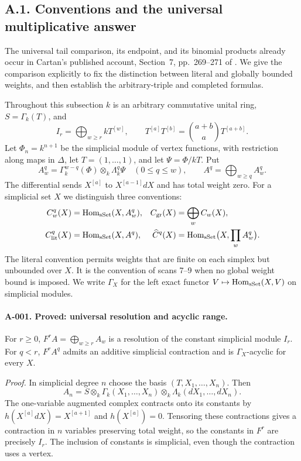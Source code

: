 \subsection{A.1. Conventions and the universal multiplicative answer}

The universal tail comparison, its endpoint, and its binomial products
already occur in Cartan's published account, Section~7,
pp.~269--271 of \cite{A_Cartan1976}. We give the comparison explicitly
to fix the distinction between literal and globally bounded weights,
and then establish the arbitrary-triple and completed formulas.

Throughout this subsection $k$ is an arbitrary commutative unital ring,
$S=\Gamma_k(T)$, and
\[
 I_r=\bigoplus_{w\geq r}kT^{[w]},\qquad
 T^{[a]}T^{[b]}=\binom{a+b}{a}T^{[a+b]}.
\]
Let $\Phi_n=k^{n+1}$ be the simplicial module of vertex functions, with
restriction along maps in $\Delta$, let $T=(1,\ldots,1)$, and let
$\Psi=\Phi/kT$. Put
\[
 A_w^q=\Gamma_k^{w-q}(\Phi)\otimes_k\Lambda_k^q\Psi
 \quad(0\leq q\leq w),\qquad A^q=\bigoplus_{w\geq q}A_w^q.
\]
The differential sends $X^{[a]}$ to $X^{[a-1]}dX$ and has total weight
zero. For a simplicial set $X$ we distinguish three conventions:
\begin{align*}
 C_w^q(X)&=\operatorname{Hom}_{\mathrm{sSet}}(X,A_w^q),&
 C_{\mathrm{gr}}(X)&=\bigoplus_w C_w(X),\\
 C_{\mathrm{lit}}^q(X)&=\operatorname{Hom}_{\mathrm{sSet}}(X,A^q),&
 \widehat C^q(X)&=\operatorname{Hom}_{\mathrm{sSet}}\bigl(X,\prod_w A_w^q\bigr).
\end{align*}
The literal convention permits weights that are finite on each simplex
but unbounded over $X$. It is the convention of scans 7--9 when no
global weight bound is imposed. We write $\Gamma_X$ for the left exact
functor $V\mapsto\operatorname{Hom}_{\mathrm{sSet}}(X,V)$ on simplicial modules.

\paragraph{A-001. Proved: universal resolution and acyclic range.}
For $r\geq0$, $F^rA=\bigoplus_{w\geq r}A_w$ is a resolution of the
constant simplicial module $I_r$. For $q<r$, $F^rA^q$ admits an additive
simplicial contraction and is $\Gamma_X$-acyclic for every $X$.

\emph{Proof.}
In simplicial degree $n$ choose the basis $(T,X_1,\ldots,X_n)$.
Then
\[
 A_n=S\otimes_k\Gamma_k(X_1,\ldots,X_n)
                 \otimes_k\Lambda_k(dX_1,\ldots,dX_n).
\]
The one-variable augmented complex contracts onto its constants by
$h(X^{[a]}dX)=X^{[a+1]}$ and $h(X^{[a]})=0$. Tensoring these
contractions gives a contraction in $n$ variables preserving total
weight, so the constants in $F^r$ are precisely $I_r$. The inclusion
of constants is simplicial, even though the contraction uses a vertex.

